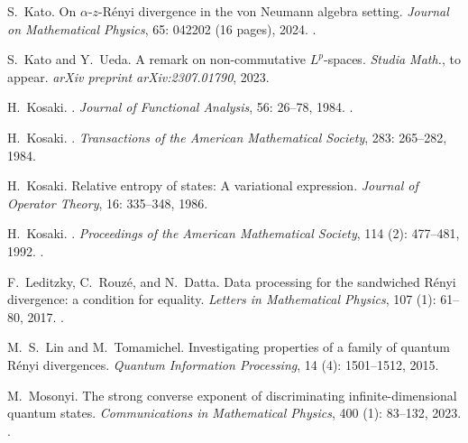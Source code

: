 \documentclass[12pt]{article}
\theoremstyle{definition}
\theoremstyle{remark}
\numberwithin{equation}{section}
\begin{document}
\begin{thebibliography}{27}
S.~Kato.
\newblock On $\alpha $-$ z $-{R}\'enyi divergence in the von {N}eumann algebra
  setting.
\newblock \emph{Journal on Mathematical Physics}, 65: 042202 (16 pages),  2024.
\newblock {}.


S.~Kato and Y.~Ueda.
\newblock A remark on non-commutative {$L^p$}-spaces.
\newblock \emph{Studia Math.}, to appear.
\newblock \emph{arXiv preprint arXiv:2307.01790}, 2023.

H.~Kosaki.
.
\newblock \emph{Journal of Functional Analysis}, {56}: 26--78,
  {1984}{}.
\newblock {}.

H.~Kosaki.
.
\newblock \emph{Transactions of the American Mathematical Society}, {283}: 265--282,
  {1984}{}.

H.~Kosaki.
\newblock Relative entropy of states: A variational expression.
\newblock \emph{Journal of Operator Theory}, 16: 335--348, 1986.

H.~Kosaki.
.
\newblock \emph{Proceedings of the American Mathematical Society}, 114
  (2): 477--481, 1992.
\newblock {}.

F.~Leditzky, C.~Rouz{\'e}, and N.~Datta.
\newblock Data processing for the sandwiched {R}{\'e}nyi divergence: a
  condition for equality.
\newblock \emph{Letters in Mathematical Physics}, 107 (1):
  61--80, 2017.
\newblock {}.

M.~S.~Lin and M.~Tomamichel.
\newblock Investigating properties of a family of quantum R\'enyi divergences.
\newblock \emph{Quantum Information Processing}, 14
 (4): 1501--1512, 2015.

M.~Mosonyi.
\newblock The strong converse exponent of discriminating infinite-dimensional
  quantum states.
\newblock \emph{Communications in Mathematical Physics}, 400
  (1): 83--132, 2023.
\newblock {}.


\end{thebibliography}
\end{document}
